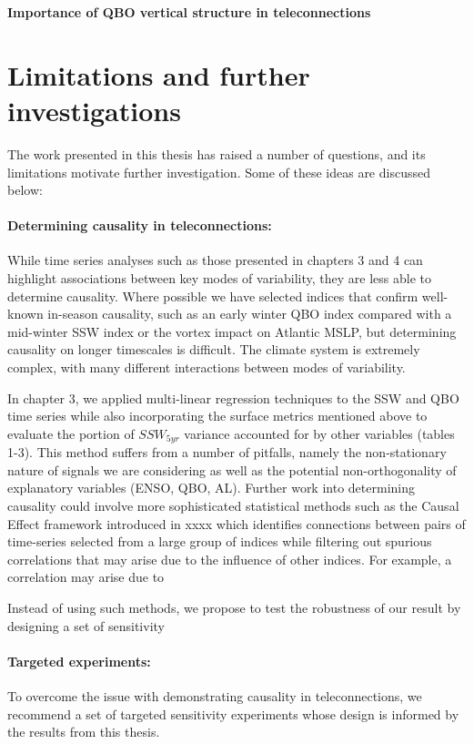 \textbf{Importance of QBO vertical structure in teleconnections}

\section{Limitations and further investigations}
\label{sec:limitations}
The work presented in this thesis has raised a number of questions, and its limitations motivate further investigation. Some of these ideas are discussed below:

\paragraph{Determining causality in teleconnections:}
While time series analyses such as those presented in chapters 3 and 4 can highlight associations between key modes of variability, they are less able to determine causality. Where possible we have selected indices that confirm well-known in-season causality, such as an early winter QBO index compared with a mid-winter SSW index or the vortex impact on Atlantic MSLP, but determining causality on longer timescales is difficult. The climate system is extremely complex, with many different interactions between modes of variability. 

In chapter 3, we applied multi-linear regression techniques to the SSW and QBO time series while also incorporating the surface metrics mentioned above to evaluate the portion of $SSW_{5yr}$ variance accounted for by other variables (tables 1-3). This method suffers from a number of pitfalls, namely the non-stationary nature of signals we are considering as well as the potential non-orthogonality of explanatory variables (ENSO, QBO, AL). Further work into determining causality could involve more sophisticated statistical methods such as the Causal Effect framework introduced in xxxx which identifies connections between pairs of time-series selected from a large group of indices while filtering out spurious correlations that may arise due to the influence of other indices. For example, a correlation may arise due to 

Instead of using such methods, we propose to test the robustness of our result by designing a set of sensitivity

\paragraph{Targeted experiments:}
To overcome the issue with demonstrating causality in teleconnections, we recommend a set of targeted sensitivity experiments whose design is informed by the results from this thesis.

